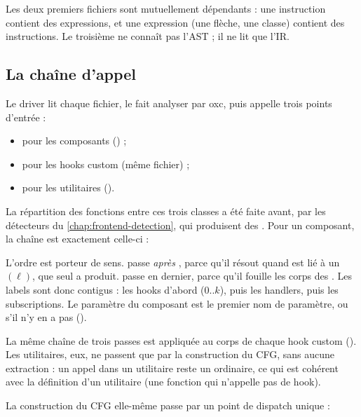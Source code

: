 Les deux premiers fichiers sont mutuellement dépendants : une instruction contient des expressions, et une expression (une flèche, une classe) contient des instructions. Le troisième ne connaît pas l'AST ; il ne lit que l'IR.

\subsection{La chaîne d'appel}

Le driver lit chaque fichier, le fait analyser par oxc, puis appelle trois points d'entrée :
\begin{itemize}
  \item {} pour les composants () ;
  \item {} pour les hooks custom (même fichier) ;
  \item {} pour les utilitaires ().
\end{itemize}
La répartition des fonctions entre ces trois classes a été faite avant, par les détecteurs du \cref{chap:frontend-detection}, qui produisent des . Pour un composant, la chaîne est exactement celle-ci :


L'ordre est porteur de sens.  passe \emph{après} , parce qu'il résout  quand  est lié à un $(\ell)$, que seul  a produit.  passe en dernier, parce qu'il fouille les corps des . Les labels sont donc contigus : les hooks d'abord ($0..k$), puis les handlers, puis les subscriptions. Le paramètre du composant est le premier nom de paramètre, ou  s'il n'y en a pas ().

La même chaîne de trois passes est appliquée au corps de chaque hook custom (). Les utilitaires, eux, ne passent que par la construction du CFG, sans aucune extraction : un appel  dans un utilitaire reste un  ordinaire, ce qui est cohérent avec la définition d'un utilitaire (une fonction qui n'appelle pas de hook).

La construction du CFG elle-même passe par un point de dispatch unique :

